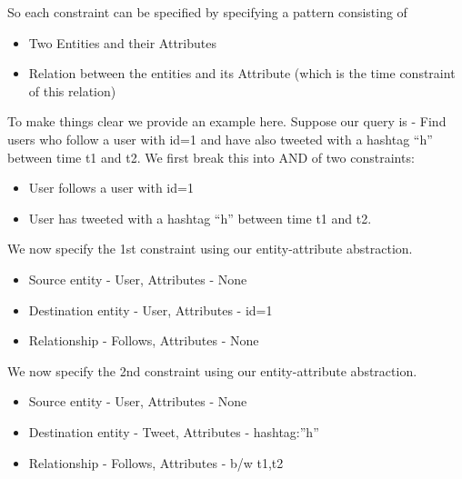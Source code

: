 \documentclass[letterpaper,10pt,english]{sphinxmanual}
\begin{document}
So each constraint can be specified by specifying a pattern consisting of
\begin{itemize}
\item {} 
Two Entities and their Attributes

\item {} 
Relation between the entities and its Attribute (which is the time constraint of this relation)

\end{itemize}

To make things clear we provide an example here.
Suppose our query is - Find users who follow a user with id=1 and have also tweeted with a hashtag “h” between time t1 and t2.
We first break this into AND of two constraints:
\begin{itemize}
\item {} 
User follows a user with id=1

\item {} 
User has tweeted with a hashtag “h” between time t1 and t2.

\end{itemize}

We now specify the 1st constraint using our entity-attribute abstraction.
\begin{itemize}
\item {} 
Source entity - User, Attributes - None

\item {} 
Destination entity - User, Attributes - id=1

\item {} 
Relationship - Follows, Attributes - None

\end{itemize}

We now specify the 2nd constraint using our entity-attribute abstraction.
\begin{itemize}
\item {} 
Source entity - User, Attributes - None

\item {} 
Destination entity - Tweet, Attributes - hashtag:”h”

\item {} 
Relationship - Follows, Attributes - b/w t1,t2

\end{itemize}
\end{document}

